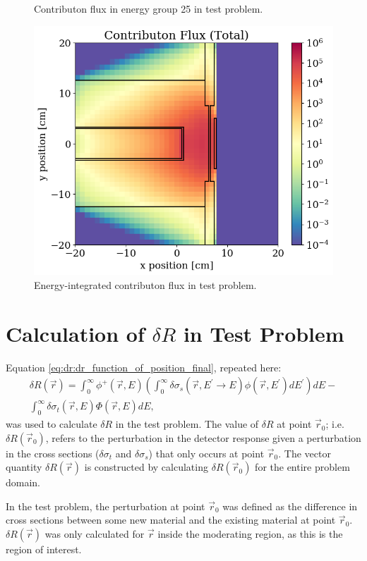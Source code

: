 \begin{figure}
\begin{minipage}{0.495\linewidth}
    \caption{Contributon flux in energy group 25 in test problem.}
    \label{fig:tp:scalar_flux_con_g25}
  \end{minipage}
  \centering
  \includegraphics[width=0.495\linewidth]{content/testprob/scalar_flux_con_total.png}
  \caption{Energy-integrated contributon flux in test problem.}
  \label{fig:tp:scalar_flux_con_total}
\end{figure}

\section{Calculation of $\delta R$ in Test Problem}
\label{sec:bg:tp:dr}

Equation \ref{eq:dr:dr_function_of_position_final}, repeated here:
\begin{multline*}
  \delta R\left(\vec{r}\right) =
  \int_0^\infty\phi^+\left(\vec{r},E\right)\left(\int_0^\infty\delta\sigma_s\left(\vec{r},E^\prime\rightarrow E\right)\phi\left(\vec{r},E^\prime\right)dE^\prime\right)dE - \\
  \int_0^\infty\delta\sigma_t\left(\vec{r},E\right)\Phi\left(\vec{r},E\right)dE,
\end{multline*}
was used to calculate $\delta R$ in the test problem.
The value of $\delta R$ at point $\vec{r}_0$; i.e. $\delta R\left(\vec{r}_0\right)$, refers to the perturbation in the detector response given a perturbation in the cross sections ($\delta \sigma_t$ and $\delta \sigma_s$) that only occurs at point $\vec{r}_0$.
The vector quantity $\delta R\left(\vec{r}\right)$ is constructed by calculating $\delta R\left(\vec{r}_0\right)$ for the entire problem domain.

In the test problem, the perturbation at point $\vec{r}_0$ was defined as the difference in cross sections between some new material and the existing material at point $\vec{r}_0$.
$\delta R\left(\vec{r}\right)$ was only calculated for $\vec{r}$ inside the moderating region, as this is the region of interest.

